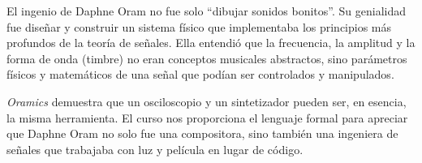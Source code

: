 \documentclass[paper=letter, fontsize=11pt, draft=false]{scrartcl}
\numberwithin{equation}{problemcounter} %
\numberwithin{figure}{problemcounter} %
\numberwithin{table}{problemcounter} %
\numberwithin{subsection}{problemcounter}
\begin{document}
El ingenio de Daphne Oram no fue solo ``dibujar sonidos bonitos''. Su genialidad fue diseñar y construir un sistema físico que implementaba los principios más profundos de la teoría de señales. Ella entendió que la frecuencia, la amplitud y la forma de onda (timbre) no eran conceptos musicales abstractos, sino parámetros físicos y matemáticos de una señal que podían ser controlados y manipulados.


\textit{Oramics} demuestra que un osciloscopio y un sintetizador pueden ser, en esencia, la misma herramienta. El curso nos proporciona el lenguaje formal para apreciar que Daphne Oram no solo fue una compositora, sino también una ingeniera de señales que trabajaba con luz y película en lugar de código.





\newpage
\end{document}

